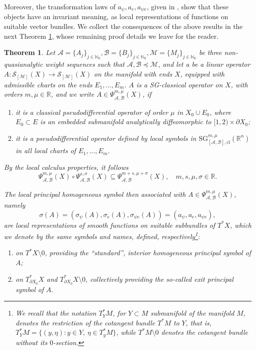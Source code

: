 \documentclass[11pt,reqno]{amsart}
\numberwithin{equation}{section}
\newtheorem{theorem}{Theorem}[section]
\newcommand{\R}{{\mathbb{R}}} %
\newcommand{\SG}{{\mathrm{SG}}}
\newcommand{\Mj}{{\{M_j\}_{j\in\mathbb{N}_0}}} %
\newcommand{\Aj}{{\{A_j\}_{j\in\mathbb{N}_0}}} %
\newcommand{\Bj}{{\{B_j\}_{j\in\mathbb{N}_0}}} %
\newcommand{\M}{{\mathcal{M}}} %
\newcommand{\A}{{\mathcal{A}}} %
\newcommand{\B}{{\mathcal{B}}} %
\begin{document}
Moreover, the transformation laws of $a_\psi, a_e, a_{\psi e}$, given in \cite{MP2002}, show that these objects have an invariant meaning, as 
local representations of functions on suitable vector bundles. We collect the consequences of the above results in the next Theorem \ref{thm:sguclmwe},
whose remaining proof details we leave for the reader.

\begin{theorem}\label{thm:sguclmwe}
Let $\A=\Aj,\B=\Bj,\M=\Mj$ be three non-quasianalytic weight sequences such that $\A,\B\preceq\M$, and let a be a linear operator 
$A\colon\mathcal{S}_{[\M]}(X)\to\mathcal{S}_{[\M]}(X)$ on the manifold with ends $X$, equipped with admissible charts on the ends
$E_1,\dots,E_m$. $A$ is a SG-classical operator on $X$, with orders $m,\mu\in\R$, and we write $A\in\Psi_{\A,\B}^{m,\mu}(X)$, if
%
\begin{enumerate}
	\item[(a)] it is a classical pseudodifferential operator of order $\mu$ in $X_0\cup E_0$, where $E_0\subset E$ is an embedded
	submanifold analytically diffeomorphic to $[1,2)\times\partial X_0$;
	\item[(b)] it is a pseudodifferential operator defined by local symbols in ${\SG}_{[\A,\B],\mathrm{cl}}^{m,\mu}(\R^n)$ in all local charts of $E_1,\dots,E_m$.  
\end{enumerate}

By the local calculus properties, it follows
%
\[
	\Psi_{\A,\B}^{m,\mu}(X)\circ\Psi_{\A,\B}^{s,\sigma}(X) \subseteq \Psi_{\A,\B}^{m+s,\mu+\sigma}(X), \quad m,s,\mu,\sigma\in\R.
\]

The local principal homogeneous symbol then associated with $A\in\Psi_{\A,\B}^{m,\mu}(X)$, namely 
%
\[
	\sigma(A)=(\sigma_\psi(A),\sigma_e(A),\sigma_{\psi e}(A))=(a_\psi,a_e,a_{\psi e}),
\]
%
are local representations of smooth functions on suitable subbundles of $T^*X$, which we denote by the same symbols and names, defined, 
respectively\footnote{We recall that the notation $T^*_YM$, for $Y\subset M$ submanifold of the manifold $M$, denotes the restriction of the
cotangent bundle $T^*M$ to $Y$, that is, $T^*_YM=\{(y,\eta)\colon y\in Y,\ \eta\in T^*_y M\}$, while $T^*M\setminus0$ denotes the cotangent bundle
without its $0$-section.}:
%
\begin{enumerate}
	\item[(c)] on $T^*X\setminus0$, providing the ``standard'', \textit{interior homogeneous principal symbol} of $A$;
	\item[(d)] on $T^*_{\partial X_0}X$ and $T^*_{\partial X_0}X\setminus0$, collectively providing the so-called \textit{exit principal symbol} of $A$.  
\end{enumerate}


\end{theorem}
\end{document}

